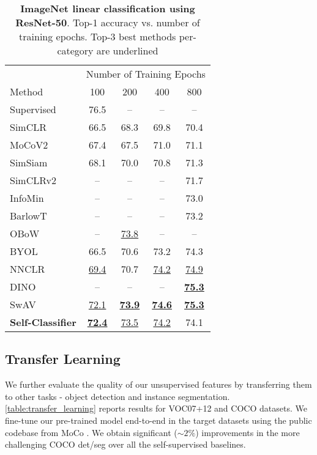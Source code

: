 \documentclass[runningheads]{llncs}
\begin{document}
\begin{table}[bt]
  \centering
  \caption{\textbf{ImageNet linear classification using ResNet-50}. Top-1 accuracy vs. number of training epochs. Top-3 best methods per-category are underlined}
  \label{table:linear_eval_imagenet}
  \setlength\tabcolsep{8pt}
  \begin{tabular}{l|cccc}
    \toprule
     & \multicolumn{4}{c}{Number of Training Epochs} \\
    Method & 100 & 200 & 400 & 800 \\
    \midrule
    Supervised & 76.5 & -- & -- & -- \\
    \midrule
    SimCLR \cite{DBLP:journals/corr/abs-2002-05709} & 66.5 & 68.3 & 69.8 & 70.4 \\
    MoCoV2 \cite{chen2020improved} & 67.4 & 67.5 & 71.0 & 71.1 \\
    SimSiam \cite{chen2021exploring} & 68.1 & 70.0 & 70.8 & 71.3 \\
    SimCLRv2 \cite{chen2020big} & -- & -- & -- & 71.7 \\
    InfoMin \cite{tian2020makes} & -- & -- & -- & 73.0 \\
    BarlowT \cite{DBLP:conf/icml/ZbontarJMLD21} & -- & -- & -- & 73.2 \\
    OBoW \cite{gidaris2021obow} & -- & \underline{73.8} & -- & -- \\
    BYOL \cite{grill2020bootstrap} & 66.5 & 70.6 & 73.2 & 74.3 \\
    NNCLR \cite{Dwibedi_2021_ICCV} & \underline{69.4} & 70.7 & \underline{74.2} & \underline{74.9} \\
    DINO \cite{caron2021emerging} & -- & -- & -- & \underline{\textbf{75.3}} \\
    SwAV \cite{caron2020unsupervised} & \underline{72.1} & \underline{\textbf{73.9}} & \underline{\textbf{74.6}} & \underline{\textbf{75.3}} \\
    \midrule
    \textbf{Self-Classifier}  & \underline{\textbf{72.4}} & \underline{73.5} & \underline{74.2} & 74.1 \\
    \bottomrule
  \end{tabular}
\end{table}

\subsection{Transfer Learning}
We further evaluate the quality of our unsupervised features by transferring them to other tasks - object detection and instance segmentation. \cref{table:transfer_learning} reports results for VOC07+12 \cite{everingham2010pascal} and COCO \cite{lin2014microsoft} datasets. We fine-tune our pre-trained model end-to-end in the target datasets using the public codebase from MoCo \cite{he2020momentum}. We obtain significant ($\sim 2\%$) improvements in the more challenging COCO det/seg over all the self-supervised baselines.
\end{document}
